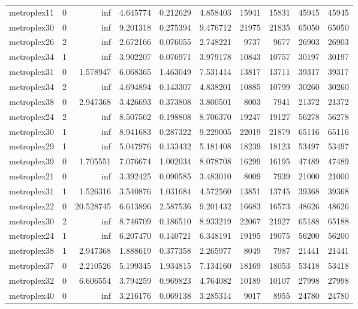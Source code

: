 \begin{longtable}{|l|r|r|r|r|r|r|r|r|r|}
metroplex11 & 0 & inf & 4.645774 & 0.212629 & 4.858403 & 15941 & 15831 & 45945 & 45945 \\
metroplex30 & 0 & inf & 9.201318 & 0.275394 & 9.476712 & 21975 & 21835 & 65050 & 65050 \\
metroplex26 & 2 & inf & 2.672166 & 0.076055 & 2.748221 & 9737 & 9677 & 26903 & 26903 \\
metroplex34 & 1 & inf & 3.902207 & 0.076971 & 3.979178 & 10843 & 10757 & 30197 & 30197 \\
metroplex31 & 0 & 1.578947 & 6.068365 & 1.463049 & 7.531414 & 13817 & 13711 & 39317 & 39317 \\
metroplex34 & 2 & inf & 4.694894 & 0.143307 & 4.838201 & 10885 & 10799 & 30260 & 30260 \\
metroplex38 & 0 & 2.947368 & 3.426693 & 0.373808 & 3.800501 & 8003 & 7941 & 21372 & 21372 \\
metroplex24 & 2 & inf & 8.507562 & 0.198808 & 8.706370 & 19247 & 19127 & 56278 & 56278 \\
metroplex30 & 1 & inf & 8.941683 & 0.287322 & 9.229005 & 22019 & 21879 & 65116 & 65116 \\
metroplex29 & 1 & inf & 5.047976 & 0.133432 & 5.181408 & 18239 & 18123 & 53497 & 53497 \\
metroplex39 & 0 & 1.705551 & 7.076674 & 1.002034 & 8.078708 & 16299 & 16195 & 47489 & 47489 \\
metroplex21 & 0 & inf & 3.392425 & 0.090585 & 3.483010 & 8009 & 7939 & 21000 & 21000 \\
metroplex31 & 1 & 1.526316 & 3.540876 & 1.031684 & 4.572560 & 13851 & 13745 & 39368 & 39368 \\
metroplex22 & 0 & 20.528745 & 6.613896 & 2.587536 & 9.201432 & 16683 & 16573 & 48626 & 48626 \\
metroplex30 & 2 & inf & 8.746709 & 0.186510 & 8.933219 & 22067 & 21927 & 65188 & 65188 \\
metroplex24 & 1 & inf & 6.207470 & 0.140721 & 6.348191 & 19195 & 19075 & 56200 & 56200 \\
metroplex38 & 1 & 2.947368 & 1.888619 & 0.377358 & 2.265977 & 8049 & 7987 & 21441 & 21441 \\
metroplex37 & 0 & 2.210526 & 5.199345 & 1.934815 & 7.134160 & 18169 & 18053 & 53418 & 53418 \\
metroplex32 & 0 & 6.606554 & 3.794259 & 0.969823 & 4.764082 & 10189 & 10107 & 27998 & 27998 \\
metroplex40 & 0 & inf & 3.216176 & 0.069138 & 3.285314 & 9017 & 8955 & 24780 & 24780 \\

\end{longtable}
